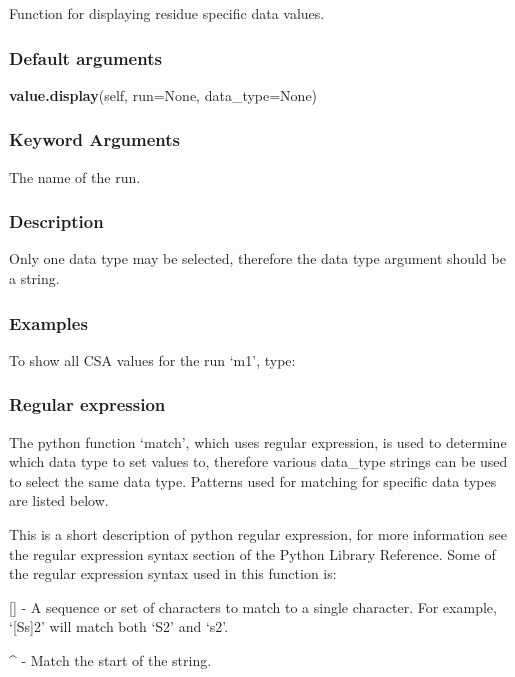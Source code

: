 Function for displaying residue specific data values.

\subsubsection{Default arguments}

\textsf{\textbf{value.display}(self, run=None, data\_type=None)}


\subsubsection{Keyword Arguments}

  The name of the run.


\subsubsection{Description}

Only one data type may be selected, therefore the data type argument should be a string.


\subsubsection{Examples}

To show all CSA values for the run `m1', type:




\subsubsection{Regular expression}

The python function `match', which uses regular expression, is used to determine which data
type to set values to, therefore various data\_type strings can be used to select the same
data type.  Patterns used for matching for specific data types are listed below.

This is a short description of python regular expression, for more information see the
regular expression syntax section of the Python Library Reference.  Some of the regular
expression syntax used in this function is:

    [] - A sequence or set of characters to match to a single character.  For example,
    `[Ss]2' will match both `S2' and `s2'.

    \^{} - Match the start of the string.


